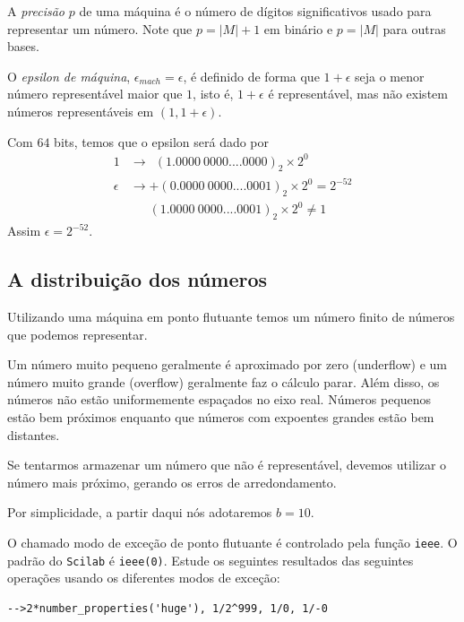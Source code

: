 A \emph{precisão} $p$ de uma máquina é o número de dígitos significativos usado para representar um número. Note que $p=|M|+1$ em binário e $p=|M|$ para outras bases.

O \emph{epsilon de máquina}, $\epsilon_{mach}=\epsilon$, é definido de forma que $1+\epsilon$ seja o menor número representável maior que $1$, isto é, $1+\epsilon$ é representável, mas não existem números representáveis em $(1, 1+\epsilon)$.

\begin{ex}
  Com $64$ bits, temos que o epsilon será dado por
\begin{equation*}
  \begin{split}
  1      &\rightarrow ~~(1.0000~0000....0000)_2\times 2^{0} \\
\epsilon &\rightarrow  +(0.0000~0000....0001)_2\times 2^{0}  = 2^{-52} \\
         &      ~~~~~~~ (1.0000~0000....0001)_2\times 2^{0} \neq 1    
  \end{split}
\end{equation*}
Assim $\epsilon = 2^{-52}$.
\end{ex}



\subsection{A distribuição dos números}
Utilizando uma máquina em ponto flutuante temos um número finito de números que podemos representar.

Um número muito pequeno geralmente é aproximado por zero (underflow) e um número muito grande (overflow) geralmente faz o cálculo parar.
Além disso, os números não estão uniformemente espaçados no eixo real. Números pequenos estão bem próximos enquanto que números com expoentes grandes estão bem distantes.

Se tentarmos armazenar um número que não é representável, devemos utilizar o número mais próximo, gerando os erros de arredondamento.

Por simplicidade, a partir daqui nós adotaremos $b=10$.

\ifisscilab
\begin{obs}
  O chamado modo de exceção de ponto flutuante é controlado pela função \verb+ieee+. O padrão do \verb+Scilab+ é \verb+ieee(0)+. Estude os seguintes resultados das seguintes operações usando os diferentes modos de exceção:
\begin{verbatim}
-->2*number_properties('huge'), 1/2^999, 1/0, 1/-0
\end{verbatim}
\end{obs}
\fi

